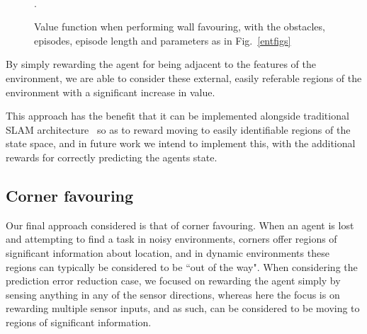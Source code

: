 \documentclass{article}
\begin{document}
\begin{figure}[ht]
\centering
{}
\\
\caption{Value function when performing wall favouring, with the obstacles, episodes, episode length and parameters as in Fig.~\ref{entfigs}}.\label{walvariant}
\end{figure}

By simply rewarding the agent for being adjacent to the features of the environment, we are able to consider these external, easily referable regions of the environment with a significant increase in value.

This approach has the benefit that it can be implemented alongside traditional SLAM architecture~\cite{thrun2002probabilistic} so as to reward moving to easily identifiable regions of the state space, and in future work we intend to implement this, with the additional rewards for correctly predicting the agents state.

\subsection{Corner favouring\label{cor}} 
Our final approach considered is that of corner favouring. When an agent is lost and attempting to find a task in noisy environments, corners offer regions of significant information about location, and in dynamic environments these regions can typically be considered to be ``out of the way". When considering the prediction error reduction case, we focused on rewarding the agent simply by sensing anything in any of the sensor directions, whereas here the focus is on rewarding multiple sensor inputs, and as such, can be considered to be moving to regions of significant information.
\end{document}
